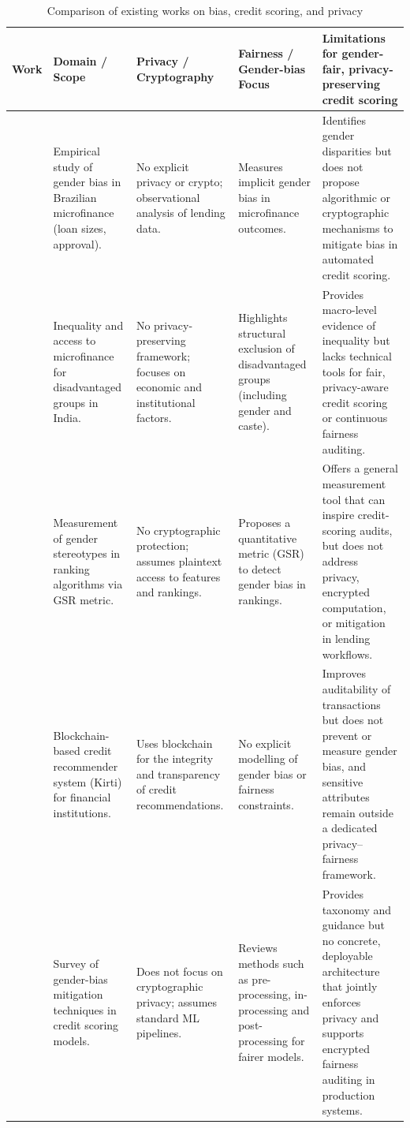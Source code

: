 \documentclass[a4paper,fleqn]{cas-dc}
\begin{document}
\begin{table}[htbp]
\centering
\caption{Comparison of existing works on bias, credit scoring, and privacy}
\label{tab:comparison}
\scriptsize
\begin{tabular}{|p{1.2cm}|p{2.8cm}|p{2.8cm}|p{2.8cm}|p{4.0cm}|}
\hline
\textbf{Work} & \textbf{Domain / Scope} & \textbf{Privacy / Cryptography} & \textbf{Fairness / Gender-bias Focus} & \textbf{Limitations for gender-fair, privacy-preserving credit scoring} \\
\hline

\cite{agier2013microfinance}
& Empirical study of gender bias in Brazilian microfinance (loan sizes, approval). 
& No explicit privacy or crypto; observational analysis of lending data. 
& Measures implicit gender bias in microfinance outcomes. 
& Identifies gender disparities but does not propose algorithmic or cryptographic mechanisms to mitigate bias in automated credit scoring. \\
\hline

\cite{baland2019socially}
& Inequality and access to microfinance for disadvantaged groups in India. 
& No privacy-preserving framework; focuses on economic and institutional factors. 
& Highlights structural exclusion of disadvantaged groups (including gender and caste). 
& Provides macro-level evidence of inequality but lacks technical tools for fair, privacy-aware credit scoring or continuous fairness auditing. \\
\hline

\cite{fabris2020gender}
& Measurement of gender stereotypes in ranking algorithms via GSR metric. 
& No cryptographic protection; assumes plaintext access to features and rankings. 
& Proposes a quantitative metric (GSR) to detect gender bias in rankings. 
& Offers a general measurement tool that can inspire credit-scoring audits, but does not address privacy, encrypted computation, or mitigation in lending workflows. \\
\hline

\cite{Patel2020kirti}
& Blockchain-based credit recommender system (Kirti) for financial institutions. 
& Uses blockchain for the integrity and transparency of credit recommendations. 
& No explicit modelling of gender bias or fairness constraints. 
& Improves auditability of transactions but does not prevent or measure gender bias, and sensitive attributes remain outside a dedicated privacy–fairness framework. \\
\hline

\cite{corrales2021review}
& Survey of gender-bias mitigation techniques in credit scoring models. 
& Does not focus on cryptographic privacy; assumes standard ML pipelines. 
& Reviews methods such as pre-processing, in-processing and post-processing for fairer models. 
& Provides taxonomy and guidance but no concrete, deployable architecture that jointly enforces privacy and supports encrypted fairness auditing in production systems. \\
\hline


\end{tabular}
\end{table}
\end{document}
